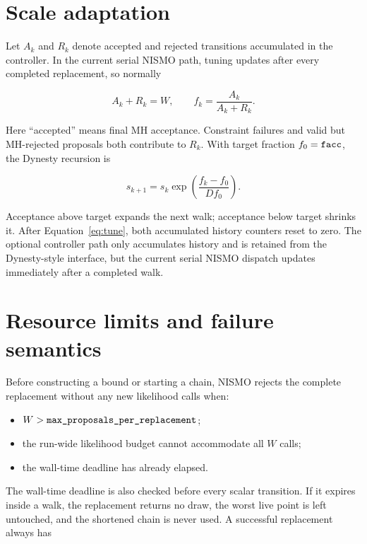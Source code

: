 \documentclass[11pt,a4paper]{article}
\newcommand{\NISMO}{\textsc{NISMO}}
\newcommand{\code}[1]{\texttt{\detokenize{#1}}}
\begin{document}
\section{Scale adaptation}

Let \(A_k\) and \(R_k\) denote accepted and rejected transitions accumulated
in the controller.  In the current serial \NISMO{} path, tuning updates after
every completed replacement, so normally

\begin{equation}
  A_k+R_k=W,
  \qquad
  f_k=\frac{A_k}{A_k+R_k}.
\end{equation}

Here ``accepted'' means final MH acceptance.  Constraint failures and valid
but MH-rejected proposals both contribute to \(R_k\).  With target fraction
\(f_0=\code{facc}\), the Dynesty recursion is

\begin{equation}
  s_{k+1}
  =s_k\exp\left(\frac{f_k-f_0}{D f_0}\right).
  \label{eq:tune}
\end{equation}

Acceptance above target expands the next walk; acceptance below target shrinks
it.  After Equation~\eqref{eq:tune}, both accumulated history counters reset
to zero.  The optional \code{update=False} controller path only accumulates
history and is retained from the Dynesty-style interface, but the current
serial \NISMO{} dispatch updates immediately after a completed walk.

\section{Resource limits and failure semantics}

Before constructing a bound or starting a chain, \NISMO{} rejects the complete
replacement without any new likelihood calls when:

\begin{itemize}
  \item \(W>\code{max_proposals_per_replacement}\);
  \item the run-wide likelihood budget cannot accommodate all \(W\) calls;
  \item the wall-time deadline has already elapsed.
\end{itemize}

The wall-time deadline is also checked before every scalar transition.  If it
expires inside a walk, the replacement returns no draw, the worst live point
is left untouched, and the shortened chain is never used.  A successful
replacement always has
\end{document}
